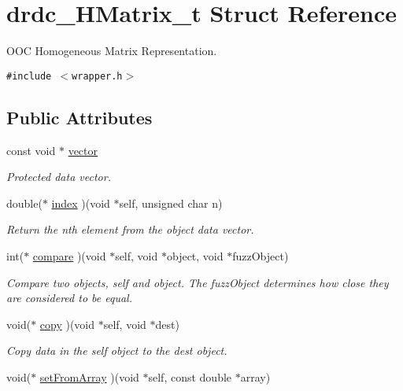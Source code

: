 \hypertarget{structdrdc__HMatrix__t}{
\section{drdc\_\-HMatrix\_\-t Struct Reference}
\label{structdrdc__HMatrix__t}
}
OOC Homogeneous Matrix Representation.  


{\tt \#include $<$wrapper.h$>$}

\subsection*{Public Attributes}
\begin{CompactItemize}
\item 
const void $\ast$ \hyperlink{structdrdc__HMatrix__t_aec735496db11c4c267fbb03f5942a28}{vector}
\begin{CompactList}\small\item\em Protected data vector. \item\end{CompactList}\item 
double($\ast$ \hyperlink{structdrdc__HMatrix__t_bbd23dbb134b5f1b054d8400a2dc94b2}{index} )(void $\ast$self, unsigned char n)
\begin{CompactList}\small\item\em Return the nth element from the object data vector. \item\end{CompactList}\item 
int($\ast$ \hyperlink{structdrdc__HMatrix__t_c17f29dbfcfdc85c5f88459e4fac271b}{compare} )(void $\ast$self, void $\ast$object, void $\ast$fuzzObject)
\begin{CompactList}\small\item\em Compare two objects, self and object. The fuzzObject determines how close they are considered to be equal. \item\end{CompactList}\item 
void($\ast$ \hyperlink{structdrdc__HMatrix__t_ca44c3cfeb886b90f0f2af83ddee3e19}{copy} )(void $\ast$self, void $\ast$dest)
\begin{CompactList}\small\item\em Copy data in the self object to the dest object. \item\end{CompactList}\item 
void($\ast$ \hyperlink{structdrdc__HMatrix__t_75b930c8a51cd0fa0a163ca2313d1221}{setFromArray} )(void $\ast$self, const double $\ast$array)

\end{CompactItemize}
